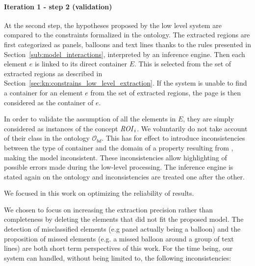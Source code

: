 \paragraph{Iteration 1 - step 2 (validation)} %
\label{par:step_2}
At the second step, the hypotheses proposed by the low level system are compared to the constraints formalized in the ontology.
The extracted regions are first categorized as panels, balloons and text lines thanks to the rules presented in Section~\ref{sub:model_interactions}, interpreted by an inference engine.
Then each element $e$ is linked to its direct container $E$.
This is selected from the set of extracted regions as described in Section~\ref{sec:kn:constrains_low_level_extraction}.
If the system is unable to find a container for an element $e$ from the set of extracted regions, the page is then considered as the container of $e$.

In order to validate the assumption of all the elements in $E$, they are simply considered as instances of the concept ${\it ROI}_i$.
We voluntarily do not take account of their class in the ontology $\mathcal{O}_ {bd}$.
This has for effect to introduce inconsistencies between the type of container and the domain of a property resulting from , making the model inconsistent.
These inconsistencies allow highlighting of possible errors made during the low-level processing.
The inference engine is stated again on the ontology and inconsistencies are treated one after the other.

We focused in this work on optimizing the reliability of results.


We chosen to focus on increasing the extraction precision  rather than completeness by deleting the elements that did not fit the proposed model.
The detection of misclassified elements (e.g panel actually being a balloon) and the proposition of missed elements (e.g. a missed balloon around a group of text lines) are both short term perspectives of this work.
For the time being, our system can handled, without being limited to, the following inconsistencies:


